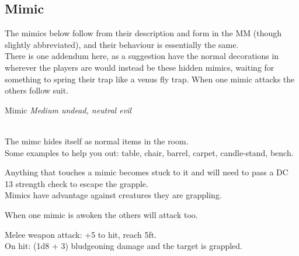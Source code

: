\documentclass[10pt,twoside,twocolumn]{article}
\begin{document}
\subsection{Mimic}

The mimics below follow from their description and form in the MM (though slightly abbreviated), and their behaviour is essentially the same. \\

There is one addendum here, as a suggestion have the normal decorations in wherever the players are would instead be these hidden mimics, waiting for something to spring their trap like a venus fly trap. When one mimic attacks the others follow suit. \\

\begin{monsterbox}{Mimic}
	\textit{Medium undead, neutral evil}\\
	\hline
	\basics[%
	armorclass = 12,
	hitpoints  = 58 (9d8 + 18),
	speed      = 15 ft
	]
	\hline
	\stats[
	STR = 17 (+3),
	DEX = 12 (+1),
	CON = 15 (+2),
	INT = 5 (-3),
	WIS = 13 (+1),
	CHA = 8 (-1)
	]
	\hline
	\details[%
	languages = {Understands common, can't speak},
	]
	\hline \\[1mm]
	\begin{monsteraction}[Shapechanger]
		The mimc hides itself as normal items in the room. \\
		
		Some examples to help you out: table, chair, barrel, carpet, candle-stand, bench.
	\end{monsteraction}
	\begin{monsteraction}[Adhesive]
		Anything that touches a mimic becomes stuck to it and will need to pass a DC 13 strength check to escape the grapple. \\
		
		Mimics have advantage against creatures they are grappling.
	\end{monsteraction}
	\begin{monsteraction}[Stirring]
		When one mimic is awoken the others will attack too.
	\end{monsteraction}
	\begin{monsteraction}[Pseudopod.]
		Melee weapon attack: +5 to hit, reach 5ft. \\
		
		On hit: (1d8 + 3) bludgeoning damage and the target is grappled.
	\end{monsteraction}
\end{monsterbox}
\end{document}
